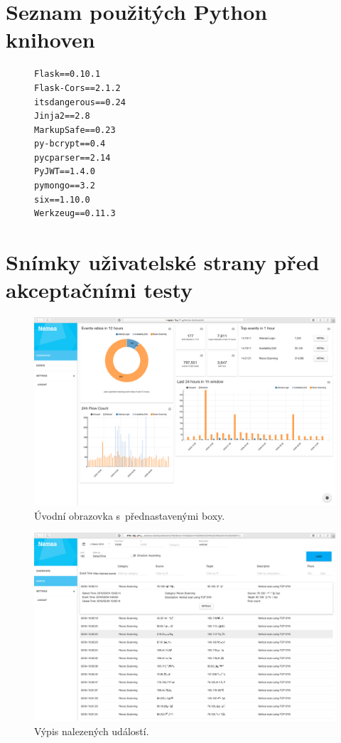 \chapter{Seznam použitých Python knihoven}

\begin{figure}[ht]
\lstset{basicstyle=\small,style=JSON}
\begin{lstlisting}
Flask==0.10.1
Flask-Cors==2.1.2
itsdangerous==0.24
Jinja2==2.8
MarkupSafe==0.23
py-bcrypt==0.4
pycparser==2.14
PyJWT==1.4.0
pymongo==3.2
six==1.10.0
Werkzeug==0.11.3
\end{lstlisting}
\label{code:requirements}
\end{figure}

\chapter{Snímky uživatelské strany před akceptačními testy}
\label{screens:before}

\begin{figure}[ht]
    \centering
    \includegraphics[width=1\textwidth]{fig/screen_before_1.png}
    \caption{Úvodní obrazovka s~přednastavenými boxy.} \label{screen:before:1}
\end{figure}

\begin{figure}[ht]
    \centering
    \includegraphics[width=1\textwidth]{fig/screen_before_2.png}
    \caption{Výpis nalezených událostí.} \label{screen:before:2}
\end{figure}

